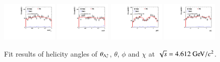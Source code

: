 \begin{figure}[H]\centering
    \includegraphics[width=0.24\textwidth]{figure/polarimetery/angular_plots/pkpi_4612_cos_theta0.pdf}
    \includegraphics[width=0.24\textwidth]{figure/polarimetery/angular_plots/pkpi_4612_cos_theta1.pdf}
    \includegraphics[width=0.24\textwidth]{figure/polarimetery/angular_plots/pkpi_4612_phi1.pdf}
    \includegraphics[width=0.24\textwidth]{figure/polarimetery/angular_plots/pkpi_4612_phi2.pdf}
    \caption{Fit results of helicity angles of $\theta_{\Lambda_{c}^{+}}$, $\theta$, $\phi$ and $\chi$ at $\sqrt{s} = 4.612\gev/c^2$.}
\label{fig:fit_angular_s1}
\end{figure}

